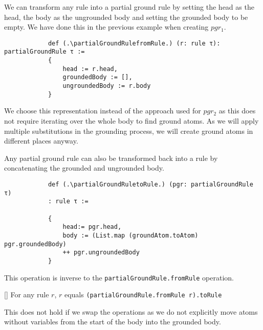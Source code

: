        We can transform any rule into a partial ground rule by setting the head as the head, the body as the ungrounded body and setting the grounded body to be empty. We have done this in the previous example when creating $pgr_1$.

        \begin{lstlisting}
            def (.\partialGroundRulefromRule.) (r: rule τ): partialGroundRule τ :=
            {
                head := r.head, 
                groundedBody := [],
                ungroundedBody := r.body
            }
        \end{lstlisting}

        We choose this representation instead of the approach used for $pgr_2$ as this does not require iterating over the whole body to find ground atoms. As we will apply multiple substitutions in the grounding process, we will create ground atoms in different places anyway.

        Any partial ground rule can also be transformed back into a rule by concatenating the grounded and ungrounded body.

        \begin{lstlisting}
            def (.\partialGroundRuletoRule.) (pgr: partialGroundRule τ)
            : rule τ :=
    
            {
                head:= pgr.head, 
                body := (List.map (groundAtom.toAtom) pgr.groundedBody)
                ++ pgr.ungroundedBody
            }
        \end{lstlisting}
        
        This operation is inverse to the \lstinline|partialGroundRule.fromRule| operation.

        \begin{lemma}\label{lem:toRuleFromRuleInv}[\partialGroundRuleToRuleInverseToFromRule]
            For any rule $r$, $r$ equals \lstinline|(partialGroundRule.fromRule r).toRule|
        \end{lemma}

        This does not hold if we swap the operations as we do not explicitly move atoms without variables from the start of the body into the grounded body.

